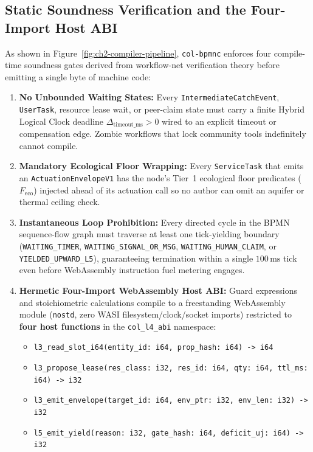 \subsection{Static Soundness Verification and the Four-Import Host ABI}

As shown in Figure~\ref{fig:ch2-compiler-pipeline}, \texttt{col-bpmnc} enforces four
compile-time soundness gates derived from workflow-net verification theory
\parencite{vanderaalst1998application} before emitting a single byte of machine code:

\begin{enumerate}
\item \textbf{No Unbounded Waiting States:} Every \texttt{IntermediateCatchEvent},
        \texttt{UserTask}, resource lease wait, or peer-claim state must carry a finite
        Hybrid Logical Clock deadline $\Delta_{\mathrm{timeout\_ms}} > 0$ wired to an
        explicit timeout or compensation edge. Zombie workflows that lock community tools
        indefinitely cannot compile.
\item \textbf{Mandatory Ecological Floor Wrapping:} Every \texttt{ServiceTask} that emits an
        \texttt{ActuationEnvelopeV1} has the node's Tier~1 ecological floor predicates
        ($F_{\mathrm{eco}}$) injected ahead of its actuation call so no author can omit an
        aquifer or thermal ceiling check.
\item \textbf{Instantaneous Loop Prohibition:} Every directed cycle in the BPMN
        sequence-flow graph must traverse at least one tick-yielding boundary
        (\texttt{WAITING\_TIMER}, \texttt{WAITING\_SIGNAL\_OR\_MSG},
        \texttt{WAITING\_HUMAN\_CLAIM}, or \texttt{YIELDED\_UPWARD\_L5}), guaranteeing
        termination within a single $100\,\mathrm{ms}$ tick even before WebAssembly
        instruction fuel metering engages.
\item \textbf{Hermetic Four-Import WebAssembly Host ABI:} Guard expressions and
        stoichiometric calculations compile to a freestanding WebAssembly module
        (\texttt{nostd}, zero WASI filesystem/clock/socket imports) restricted to
        \textbf{four host functions} in the \texttt{col\_l4\_abi} namespace:
    \begin{itemize}
        \item \texttt{l3\_read\_slot\_i64(entity\_id: i64, prop\_hash: i64) -> i64}
\item \texttt{l3\_propose\_lease(res\_class: i32, res\_id: i64, qty: i64, ttl\_ms: i64) ->
            i32}
\item \texttt{l3\_emit\_envelope(target\_id: i64, env\_ptr: i32, env\_len: i32) -> i32}
\item \texttt{l5\_emit\_yield(reason: i32, gate\_hash: i64, deficit\_uj: i64) -> i32}
    \end{itemize}
\end{enumerate}

